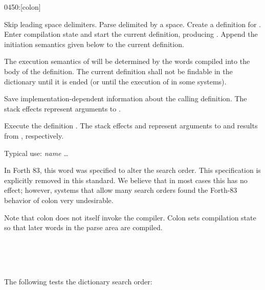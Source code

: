 \vspace*{-1.5ex}\enlargethispage{4ex}
\begin{worddef}{0450}{:}[colon]
\item {}

	Skip leading space delimiters. Parse  delimited by a
	space. Create a definition for . Enter compilation state and start the current
	definition, producing . Append the initiation
	semantics given below to the current definition.

	The execution semantics of  will be determined by the
	words compiled into the body of the definition. The current
	definition shall not be findable in the dictionary until it is
	ended (or until the execution of  in some systems).

\init {}

	Save implementation-dependent information 
	about the calling definition. The stack effects 
	represent arguments to .

\execute[name]

	Execute the definition . The stack effects
	 and  represent arguments to and
	results from , respectively.

	\walso{core:[}
	\walso{core:]}

	\begin{rationale} %
          
		Typical use:
			\word{:} \emph{name} {\ldots} \word{;}

		In Forth 83, this word was specified to alter the search order.
		This specification is explicitly removed in this standard. We
		believe that in most cases this has no effect; however, systems
		that allow many search orders found the Forth-83 behavior of
		colon very undesirable.

		Note that colon does not itself invoke the compiler. Colon sets
		compilation state so that later words in the parse area are
		compiled.
	\end{rationale}

	\begin{testing} %
		 \\
		 \\
		 \\

		The following tests the dictionary search order:

		 \\
	\end{testing}
\end{worddef}
